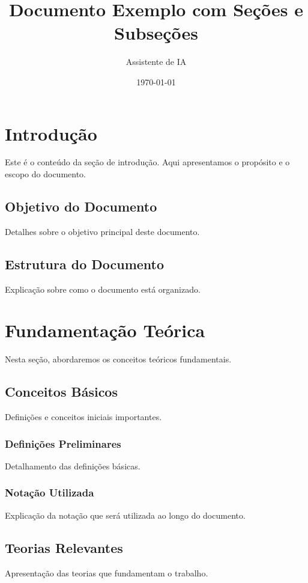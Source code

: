 \documentclass{article}
\title{Documento Exemplo com Seções e Subseções}
\author{Assistente de IA}
\date{\today}
\begin{document}
\maketitle

\tableofcontents
\newpage

\section{Introdução}
Este é o conteúdo da seção de introdução. Aqui apresentamos o propósito e o escopo do documento.

\subsection{Objetivo do Documento}
Detalhes sobre o objetivo principal deste documento.

\subsection{Estrutura do Documento}
Explicação sobre como o documento está organizado.

\section{Fundamentação Teórica}
Nesta seção, abordaremos os conceitos teóricos fundamentais.

\subsection{Conceitos Básicos}
Definições e conceitos iniciais importantes.

\subsubsection{Definições Preliminares}
Detalhamento das definições básicas.

\subsubsection{Notação Utilizada}
Explicação da notação que será utilizada ao longo do documento.

\subsection{Teorias Relevantes}
Apresentação das teorias que fundamentam o trabalho.
\end{document}

